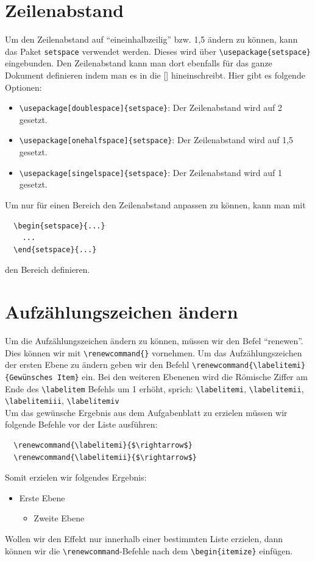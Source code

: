 \documentclass[
12pt,
ngerman
]{scrreprt}
\begin{document}
\section{Zeilenabstand}
\label{sec:linespace}
Um den Zeilenabstand auf "`eineinhalbzeilig"' bzw. 1,5 ändern zu können, kann das Paket \verb!setspace! verwendet werden. Dieses wird über \verb!\usepackage{setspace}! eingebunden. Den Zeilenabstand kann man dort ebenfalls für das ganze Dokument definieren indem man es in die [] hineinschreibt. Hier gibt es folgende Optionen:
\begin{itemize}
  \item \verb!\usepackage[doublespace]{setspace}!: Der Zeilenabstand wird auf 2 gesetzt.
  \item \verb!\usepackage[onehalfspace]{setspace}!: Der Zeilenabstand wird auf 1,5 gesetzt.
  \item \verb!\usepackage[singelspace]{setspace}!: Der Zeilenabstand wird auf 1 gesetzt.
\end{itemize}
Um nur für einen Bereich den Zeilenabstand anpassen zu können, kann man mit
\begin{verbatim}
  \begin{setspace}{...}
    ...
  \end{setspace}{...}
\end{verbatim}
den Bereich definieren.

\section{Aufzählungszeichen ändern}
\label{sec:itemize-labels}
Um die Aufzählungszeichen ändern zu können, müssen wir den Befel "`renewen"'. Dies können wir mit \verb!\renewcommand{}! vornehmen. Um das Aufzählungszeichen der ersten Ebene zu ändern geben wir den Befehl \verb!\renewcommand{\labelitemi}{Gewünsches Item}! ein. Bei den weiteren Ebenenen wird die Römische Ziffer am Ende des \verb!\labelitem! Befehls um 1 erhöht, sprich: \verb!\labelitemi!, \verb!\labelitemii!, \verb!\labelitemiii!, \verb!\labelitemiv!\\
Um das gewünsche Ergebnis aus dem Aufgabenblatt zu erzielen müssen wir folgende Befehle vor der Liste ausführen:
\begin{verbatim}
  \renewcommand{\labelitemi}{$\rightarrow$}
  \renewcommand{\labelitemii}{$\rightarrow$}
\end{verbatim}
Somit erzielen wir folgendes Ergebnis:
\begin{itemize}
  \renewcommand{\labelitemi}{$\rightarrow$}
  \renewcommand{\labelitemii}{$\rightarrow$}
  \item Erste Ebene
  \begin{itemize}
    \item Zweite Ebene
  \end{itemize}
\end{itemize}
Wollen wir den Effekt nur innerhalb einer bestimmten Liste erzielen, dann können wir die \verb!\renewcommand!-Befehle nach dem \verb!\begin{itemize}! einfügen.
\end{document}
